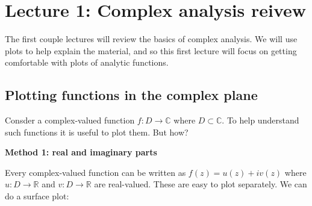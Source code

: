 \documentclass[12pt,a4paper]{article}
\begin{document}
\section{Lecture 1: Complex analysis reivew}
The first  couple lectures will review the basics of complex analysis.  We will use plots to help explain the material, and so this first lecture will focus on getting comfortable with plots of analytic functions.

\subsection{Plotting functions in the complex plane}
Consder a complex-valued function $f : D \rightarrow {\mathbb C}$ where $D \subset {\mathbb C}$. To help understand such functions it is useful to plot them.  But how?

\textbf{Method 1: real and imaginary parts}

Every complex-valued function can be written as $f(z) = u(z) + i v(z)$ where $u : D \rightarrow {\mathbb R}$ and $v : D \rightarrow {\mathbb R}$ are real-valued. These are easy to plot separately. We can do a surface plot:
\end{document}
